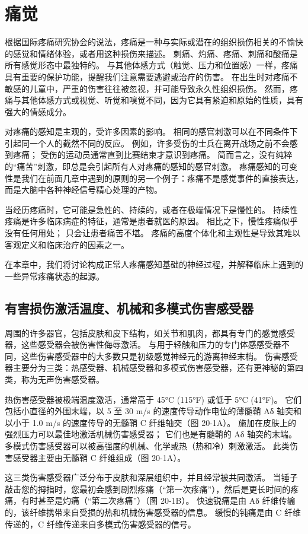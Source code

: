 \chapter{痛觉} \label{chap:chap20}
根据国际疼痛研究协会的说法，疼痛是一种与实际或潜在的组织损伤相关的不愉快的感觉和情绪体验，或者用这种损伤来描述。 刺痛、灼痛、疼痛、刺痛和酸痛是所有感觉形态中最独特的。 与其他体感方式（触觉、压力和位置感）一样，疼痛具有重要的保护功能，提醒我们注意需要逃避或治疗的伤害。 在出生时对疼痛不敏感的儿童中，严重的伤害往往被忽视，并可能导致永久性组织损伤。 然而，疼痛与其他体感方式或视觉、听觉和嗅觉不同，因为它具有紧迫和原始的性质，具有强大的情感成分。

对疼痛的感知是主观的，受许多因素的影响。 相同的感官刺激可以在不同条件下引起同一个人的截然不同的反应。 例如，许多受伤的士兵在离开战场之前不会感到疼痛； 受伤的运动员通常直到比赛结束才意识到疼痛。 简而言之，没有纯粹的“痛苦”刺激，即总是会引起所有人对疼痛的感知的感官刺激。 疼痛感知的可变性是我们在前面几章中遇到的原则的另一个例子：疼痛不是感觉事件的直接表达，而是大脑中各种神经信号精心处理的产物。

当经历疼痛时，它可能是急性的、持续的，或者在极端情况下是慢性的。 持续性疼痛是许多临床病症的特征，通常是患者就医的原因。 相比之下，慢性疼痛似乎没有任何用处； 只会让患者痛苦不堪。 疼痛的高度个体化和主观性是导致其难以客观定义和临床治疗的因素之一。

在本章中，我们将讨论构成正常人疼痛感知基础的神经过程，并解释临床上遇到的一些异常疼痛状态的起源。


\section{有害损伤激活温度、机械和多模式伤害感受器}
周围的许多器官，包括皮肤和皮下结构，如关节和肌肉，都具有专门的感觉感受器，这些感受器会被伤害性侮辱激活。 与用于轻触和压力的专门体感感受器不同，这些伤害感受器中的大多数只是初级感觉神经元的游离神经末梢。 伤害感受器主要分为三类：热感受器、机械感受器和多模式伤害感受器，还有更神秘的第四类，称为无声伤害感受器。

热伤害感受器被极端温度激活，通常高于 45°C (115°F) 或低于 5°C (41°F)。 它们包括小直径的外围末端，以 5 至 30 m/s 的速度传导动作电位的薄髓鞘 Aδ 轴突和以小于 1.0 m/s 的速度传导的无髓鞘 C 纤维轴突（图 20-1A）。 施加在皮肤上的强烈压力可以最佳地激活机械伤害感受器； 它们也是有髓鞘的 Aδ 轴突的末端。 多模式伤害感受器可以被高强度的机械、化学或热（热和冷）刺激激活。 此类伤害感受器主要由无髓鞘 C 纤维组成（图 20-1A）。

这三类伤害感受器广泛分布于皮肤和深层组织中，并且经常被共同激活。 当锤子敲击您的拇指时，您最初会感到剧烈疼痛（“第一次疼痛”），然后是更长时间的疼痛，有时甚至是灼痛（“第二次疼痛”）（图 20-1B）。 快速锐痛是由 Aδ 纤维传输的，该纤维携带来自受损的热和机械伤害感受器的信息。 缓慢的钝痛是由 C 纤维传递的，C 纤维传递来自多模式伤害感受器的信号。

